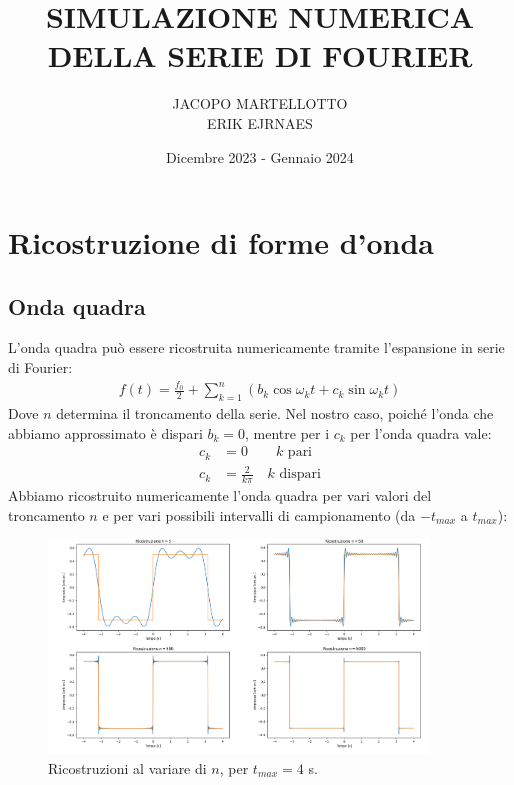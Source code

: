 \documentclass{article}[a4paper, oneside,11pt]
\title{SIMULAZIONE NUMERICA DELLA SERIE DI FOURIER}
\author{JACOPO MARTELLOTTO\\ERIK EJRNAES}
\date{Dicembre 2023 - Gennaio 2024}
\begin{document}
\maketitle

\section{Ricostruzione di forme d'onda}
    \subsection{Onda quadra}
    L'onda quadra può essere ricostruita numericamente tramite l'espansione in serie di Fourier:
    \begin{align}
        f(t) = \frac{f_0}{2} + \sum_{k=1}^{n} \left(b_k \cos{\omega_k t} + c_k \sin{\omega_k t} \right) 
        \label{Serie di Fourier}
    \end{align}
    Dove $n$ determina il troncamento della serie. Nel nostro caso, poiché l'onda che abbiamo approssimato è dispari $b_k = 0$, mentre per i $c_k$ per l'onda quadra vale:
    \begin{align*}
        c_k &= 0 \qquad k \text{ pari}\\
        c_k &= \frac{2}{k\pi} \quad k \text{ dispari}
    \end{align*}
    Abbiamo ricostruito numericamente l'onda quadra per vari valori del troncamento $n$ e per vari possibili intervalli di campionamento (da $-t_{max}$ a $t_{max}$):
        \begin{figure}[H]
            \centering
            \includegraphics[width=0.9\textwidth]{img/Ricostruzione_onda_quadra_troncamento.png}
            \caption{Ricostruzioni al variare di $n$, per $t_{max}=4$ s.}
            \label{Fig_OQT}
        \end{figure}
\end{document}

